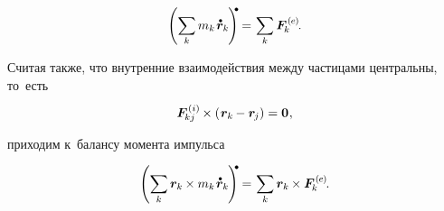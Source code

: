 \nopagebreak\vspace{-0.1em}\begin{equation}\label{balanceoftranslationalmomentum.discrete}
\left( \displaystyle \sum_{\smash{k}} m_k \hspace{.2ex} \mathdotabove{\bm{r}}_k \hspace{-0.16ex} \right)^{\hspace{-0.28em}\tikz[baseline=-0.2ex]\draw[black, fill=black] (0,0) circle (.28ex);} \hspace{-0.12ex}
= \hspace{.16ex}
\displaystyle \sum_{\smash{k}} \bm{F}^{\smthexternal}_{\hspace{-0.16ex}k} \hspace{-0.12ex}.
\end{equation}

\foreignlanguage{russian}{Считая также, что внутренние взаимодействия между частицами центральны, то~есть}

\nopagebreak\vspace{-0.1em}\begin{equation*}
\bm{F}^{\smthinternal}_{\hspace{-0.16ex}kj} \times \left( \hspace{.12ex} \bm{r}_k \hspace{-0.12ex} - \bm{r}_{\hspace{-0.16ex}j} \right) = \bm{0} \hspace{.1ex},
\end{equation*}

\vspace{-0.2em} \noindent \foreignlanguage{russian}{приходим к~балансу момента импульса}

\nopagebreak\vspace{-0.2em}\begin{equation}\label{balanceofrotationalmomentum.discrete}
\left( \displaystyle \sum_{\smash{k}} \bm{r}_k \hspace{-0.12ex} \times m_k \hspace{.2ex} \mathdotabove{\bm{r}}_k \hspace{-0.16ex} \right)^{\hspace{-0.25em}\tikz[baseline=-0.2ex]\draw[black, fill=black] (0,0) circle (.28ex);} \hspace{-0.12ex}
= \hspace{.16ex}
\displaystyle \sum_{\smash{k}} \bm{r}_k \hspace{-0.12ex} \times \bm{F}^{\smthexternal}_{\hspace{-0.16ex}k} \hspace{-0.12ex}.
\end{equation}

